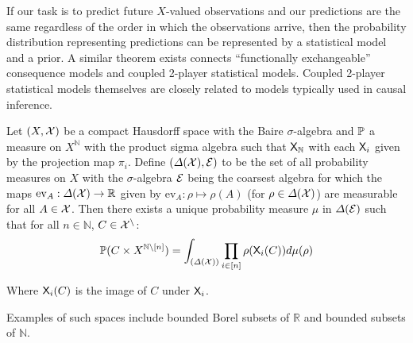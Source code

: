 If our task is to predict future $X$-valued observations and our predictions are the same regardless of the order in which the observations arrive, then the probability distribution representing predictions can be represented by a statistical model and a prior. A similar theorem exists connects ``functionally exchangeable'' consequence models and coupled 2-player statistical models. Coupled 2-player statistical models themselves are closely related to models typically used in causal inference.

\begin{theorem}
Let $(X,\mathcal{X})$ be a compact Hausdorff space with the Baire $\sigma$-algebra and $\mathbb{P}$ a measure on $X^\mathbb{N}$ with the product sigma algebra such that $\mathsf{X}_\mathbb{N}$ with each $\mathsf{X}_i$ given by the projection map $\pi_i$. Define $(\Delta(\mathcal{X}),\mathcal{E})$ to be the set of all probability measures on $X$ with the $\sigma$-algebra $\mathcal{E}$ being the coarsest algebra for which the maps $\mathrm{ev}_A:\Delta(\mathcal{X})\to \mathbb{R}$ given by $\mathrm{ev}_A:\rho\mapsto \rho(A)$ (for $\rho\in\Delta(\mathcal{X})$) are measurable for all $A\in \mathcal{X}$. Then there exists a unique probability measure $\mu$ in $\Delta(\mathcal{E})$ such that for all $n\in\mathbb{N}$, $C\in\mathcal{X^n}$:
\begin{align}
    \mathbb{P}(C\times X^{\mathbb{N}\setminus[n]}) = \int_{(\Delta(\mathcal{X}))} \prod_{i\in [n]} \rho(\mathsf{X}_i(C)) d\mu(\rho) 
\end{align}

Where $\mathsf{X}_i(C)$ is the image of $C$ under $\mathsf{X}_i$.
\end{theorem}

Examples of such spaces include bounded Borel subsets of $\mathbb{R}$ and bounded subsets of $\mathbb{N}$.


